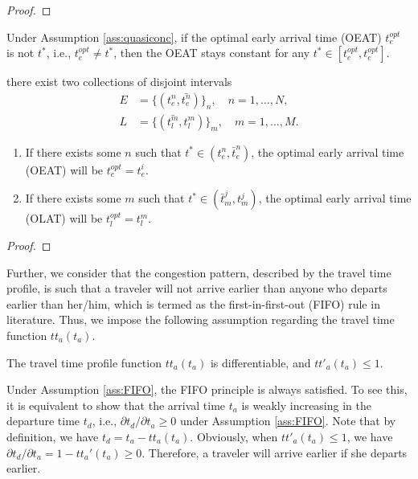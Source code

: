 \begin{proof}
    
\end{proof}

\begin{prop}

Under Assumption \ref{ass:quasiconc}, if the optimal early arrival time (OEAT) $t_e^{opt}$ is not $t^*$, i.e., $t_e^{opt} \neq t^*$,  then the OEAT stays constant for any $t^* \in [t_e^{opt}, t_e^{opt}]$.


there exist two collections of disjoint intervals
  \begin{align*}
    E & = \{(t_e^n, \bar{t_e^n})\}_n,\quad n = 1, \dots, N, \\
    L & = \{(\bar{t_l^m}, t_l^m)\}_m,\quad m = 1, \dots, M.
  \end{align*}
  \begin{enumerate}
      \item If there exists some \(n\) such that \(t^* \in (t_e^n, \bar{t}_e^n)\), the optimal early arrival time (OEAT) will be $t_e^{opt} = t_e^i$. 
      \item If there exists some \(m\) such that \(t^* \in (\bar{t}_m^j, t_m^j)\), the optimal early arrival time (OLAT) will be $t_l^{opt} = t_l^{m}$.
  \end{enumerate}

\end{prop}
\begin{proof}

\end{proof}

Further, we consider that the congestion pattern, described by the travel time profile, is such that a traveler will not arrive earlier than anyone who departs earlier than her/him, which is termed as the first-in-first-out (FIFO) rule in literature. Thus, we impose the following assumption regarding the travel time function  $tt_a(t_a)$.



\begin{assumption}\label{ass:FIFO}
The travel time profile function $tt_a(t_a)$ is differentiable, and $tt'_a(t_a) \le 1$. 
\end{assumption}


Under Assumption \ref{ass:FIFO}, the FIFO principle is always satisfied. To see this, it is equivalent to show that the arrival time $t_a$ is weakly increasing in the departure time $t_d$, i.e., $\partial t_d / \partial t_a \ge 0$ under Assumption \ref{ass:FIFO}.  Note that by definition, we have $ t_d = t_a - tt_a(t_a)  $.  Obviously, when $tt'_a(t_a) \le 1$, we have $\partial t_d / \partial t_a = 1 - tt_a'(t_a) \ge 0$. Therefore, a traveler will arrive earlier if she departs earlier. 



